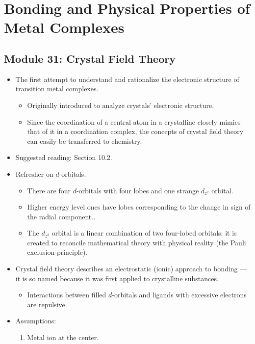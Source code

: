 \documentclass[../notes.tex]{subfiles}
\begin{document}
\chapter{Bonding and Physical Properties of Metal Complexes}
\section{Module 31: Crystal Field Theory}
\begin{itemize}
    \item The first attempt to understand and rationalize the electronic structure of transition metal complexes.
    \begin{itemize}
        \item Originally introduced to analyze crystals' electronic structure.
        \item Since the coordination of a central atom in a crystalline closely mimics that of it in a coordination complex, the concepts of crystal field theory can easily be transferred to chemistry.
    \end{itemize}
    \item Suggested reading: \textcite{bib:MiesslerFischerTarr} Section 10.2.
    \item Refresher on $d$-orbitals.
    \begin{itemize}
        \item There are four $d$-orbitals with four lobes and one strange $d_{z^2}$ orbital.
        \item Higher energy level ones have lobes corresponding to the change in sign of the radial component..
        \item The $d_{z^2}$ orbital is a linear combination of two four-lobed orbitals; it is created to reconcile mathematical theory with physical reality (the Pauli exclusion principle).
    \end{itemize}
    \item Crystal field theory describes an electrostatic (ionic) approach to bonding --- it is so named because it was first applied to crystalline substances.
    \begin{itemize}
        \item Interactions between filled $d$-orbitals and ligands with excessive electrons are repulsive.
    \end{itemize}
    \item Assumptions:
    \begin{enumerate}
        \item Metal ion at the center.

\end{enumerate}
\end{itemize}
\end{document}
